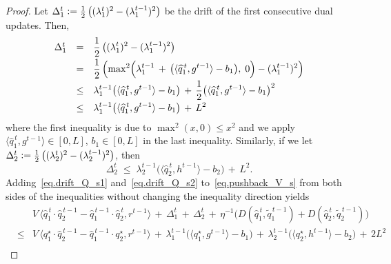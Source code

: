 \documentclass[12pt, final]{l4dc2023}
\begin{document}
\begin{proof}
	Let $\Delta_1^t\mathrel{\mathop:}= \frac{1}{2} \left((\lambda_1^{t})^2-(\lambda_1^{t-1})^2\right)$ be the drift of the first consecutive dual updates. Then,
	\begin{equation}\label{eq.drift_Q_s1}
	\begin{array}{rcl}
	\Delta_1^t &=& \displaystyle 
	\frac{1}{2}\left( ( \lambda_1^{t} )^2 - ( \lambda_1^{t-1} )^2 \right)
	\\[0.2cm]
	&=& \displaystyle 
	\frac{1}{2}\left( \max\!^2 \Big( \lambda_1^{t-1} \,+\, \big( \langle{\widehat q_1^{\,t}},{g^{t-1}}\rangle-b_1 \big),\; 0 \Big) - ( \lambda_1^{t-1} )^2 \right)
	\\[0.2cm]
	&\leq& \displaystyle 
	\lambda_1^{t-1}\big( \langle{\widehat q_1^{\,t}},{g^{t-1}}\rangle-b_1 \big) \,+\, \frac{1}{2}\big( \langle{\widehat q_1^{\,t}},{g^{t-1}}\rangle-b_1 \big)^2
	\\[0.2cm]
	&\leq& \displaystyle 
	\lambda_1^{t-1}\big( \langle{\widehat q_1^{\,t}},{g^{t-1}}\rangle-b_1 \big) \,+\, L^2
	\end{array}
	\end{equation}
	where the first inequality is due to $\max^2(x,0)\leq x^2$ and we apply $\langle{\hat q_1^{\,t}},{g^{t-1}}\rangle \in [0,L]$, $b_1\in [0,L]$ in the last inequality. Similarly, if we let $\Delta_2^t\mathrel{\mathop:}= \frac{1}{2} \left((\lambda_2^{t})^2-(\lambda_2^{t-1})^2\right)$, then
	\begin{equation}\label{eq.drift_Q_s2}
	\Delta_2^t  \;\leq\; \lambda_2^{t-1}\big( \langle{\hat q_2^{\,t}},{h^{t-1}}\rangle-b_2 \big) \,+\, L^2.
	\end{equation}
	Adding~\eqref{eq.drift_Q_s1} and~\eqref{eq.drift_Q_s2} to~\eqref{eq.pushback_V_s} from both sides of the inequalities without changing the inequality direction yields
	\begin{equation}\label{eq.pushback_VQ_s}
	\begin{array}{rcl}
	&& \!\!\!\! \!\!\!\! \!\! 
	V\, \big\langle{\hat q_1^{\,t}\cdot \hat q_2^{\,t-1}- \hat q_1^{\,t-1}\cdot \hat q_2^{\,t}},{r^{t-1}}\big\rangle 
	\,+\,
	\Delta_1^{t} 
	\,+\,
	\Delta_2^{t} 
	\,+\, \eta^{-1} \big(D(\hat q_1^{\,t},\tilde q_1^{\,t-1}) + D(\hat q_2^{\,t}, \tilde q_2^{\,t-1})\big)
	\\[0.2cm]
	&\leq& V\, \big\langle{ q_1^\star\cdot \hat q_2^{\,t-1}-\hat q_1^{\,t-1}\cdot  q_2^\star },{r^{t-1}}\big\rangle 
	\,+\,
	\lambda_1^{t-1} \big(\langle{ q_1^\star},{g^{t-1}}\rangle 
	-b_1\big)
	\,+\,
	\lambda_2^{t-1} \big( \langle{ q_2^\star},{h^{t-1}}\rangle -b_2\big)
	\,+\,2L^2
	\\[0.2cm]

\end{array}
\end{equation}
\end{proof}
\end{document}
